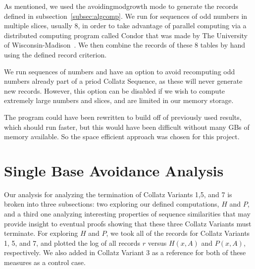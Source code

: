 As mentioned, we used the avoidingmodgrowth mode to generate the records defined in subsection~\ref{subsec:algcomp}. We run for sequences of odd numbers in multiple slices, usually 8, in order to take advantage of parallel computing via a distributed computing program called Condor that was made by The University of Wisconsin-Madison~\cite{Thain:2005:DCP:1064323.1064336}. We then combine the records of these 8 tables by hand using the defined record criterion. \par
We run sequences of numbers and have an option to avoid recomputing odd numbers already part of a priod Collatz Sequence, as these will never generate new records. However, this option can be disabled if we wish to compute extremely large numbers and slices, and are limited in our memory storage. \par
The program could have been rewritten to build off of previously used results, which should run faster, but this would have been difficult without many GBs of memory available. So the space efficient approach was chosen for this project.
\section{Single Base Avoidance Analysis} \label{subsec:algsinglebase}
Our analysis for analyzing the termination of Collatz Variants 1,5, and 7 is broken into three subsections: two exploring our defined computations, $H$ and $P$, and a third one analyzing interesting properties of sequence similarities that may provide insight to eventual proofs showing that these three Collatz Variants must terminate.
For exploring $H$ and $P$, we took all of the records for Collatz Variants 1, 5, and 7, and plotted the log of all records $r$ versus $H(x,A)$ and $P(x,A)$, respectively. We also added in Collatz Variant 3 as a reference for both of these measures as a control case.
